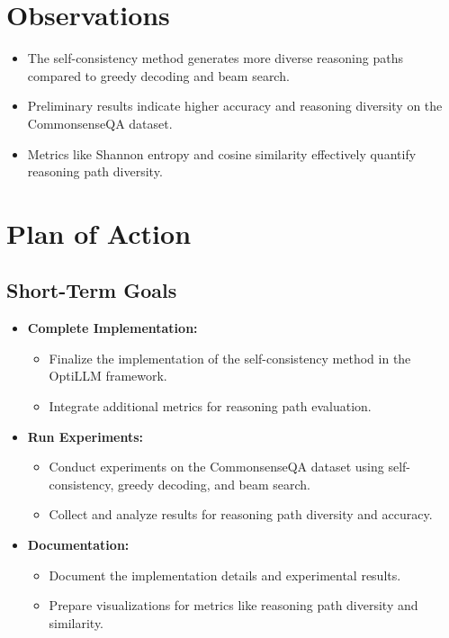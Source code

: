 \documentclass[a4paper,9pt]{article}
\begin{document}
\section*{Observations}
\noindent
\begin{itemize}
    \item The self-consistency method generates more diverse reasoning paths compared to greedy decoding and beam search.
    \item Preliminary results indicate higher accuracy and reasoning diversity on the CommonsenseQA dataset.
    \item Metrics like Shannon entropy and cosine similarity effectively quantify reasoning path diversity.
\end{itemize}

\section*{Plan of Action}

\subsection*{Short-Term Goals}
\begin{itemize}
    \item \textbf{Complete Implementation:}
    \begin{itemize}
        \item Finalize the implementation of the self-consistency method in the OptiLLM framework.
        \item Integrate additional metrics for reasoning path evaluation.
    \end{itemize}
    \item \textbf{Run Experiments:}
    \begin{itemize}
        \item Conduct experiments on the CommonsenseQA dataset using self-consistency, greedy decoding, and beam search.
        \item Collect and analyze results for reasoning path diversity and accuracy.
    \end{itemize}
    \item \textbf{Documentation:}
    \begin{itemize}
        \item Document the implementation details and experimental results.
        \item Prepare visualizations for metrics like reasoning path diversity and similarity.
    \end{itemize}
\end{itemize}
\end{document}
